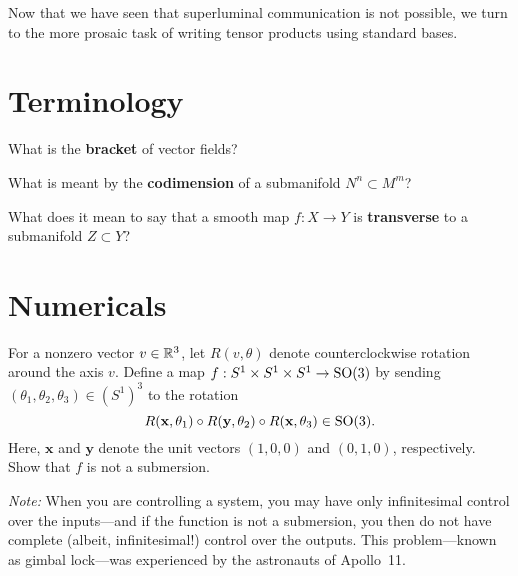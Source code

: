 \documentclass{homework}
\author{Jim Fowler}
\begin{document}
\maketitle

\begin{inspiration}
  Now that we have seen that superluminal communication is not
  possible, we turn to the more prosaic task of writing tensor
  products using standard bases.  
\end{inspiration}

\section{Terminology}

\begin{problem}
  What is the \textbf{bracket} of vector fields?
\end{problem}

\begin{problem}
  What is meant by the \textbf{codimension} of a submanifold $N^n \subset M^m$?
\end{problem}

\begin{problem}
  What does it mean to say that a smooth map $f : X \to Y$ is
  \textbf{transverse} to a submanifold $Z \subset Y$?
\end{problem}

\section{Numericals}

\begin{problem}
  For a nonzero vector $v \in \mathbb{R}^3$, let $R(v,\theta)$ denote
  counterclockwise rotation around the axis $v$.  Define a map $f :
  S^1 \times S^1 \times S^1 \to \operatorname{SO}(3)$ by sending
  $(\theta_1,\theta_2,\theta_3) \in (S^1)^3$ to the rotation
  $$
  R(\textbf{x},\theta_1) \circ R(\textbf{y},\theta_2) \circ R(\textbf{x},\theta_3) \in \operatorname{SO}(3).
  $$
  Here, $\textbf{x}$ and $\textbf{y}$ denote the unit vectors
  $(1,0,0)$ and $(0,1,0)$, respectively.  Show that $f$ is not
  a submersion.

  \textit{Note:} When you are controlling a system, you may have only
  infinitesimal control over the inputs---and if the function is not a
  submersion, you then do not have complete (albeit, infinitesimal!)
  control over the outputs.  This problem---known as gimbal lock---was
  experienced by the astronauts of Apollo~11.
\end{problem}
\end{document}
